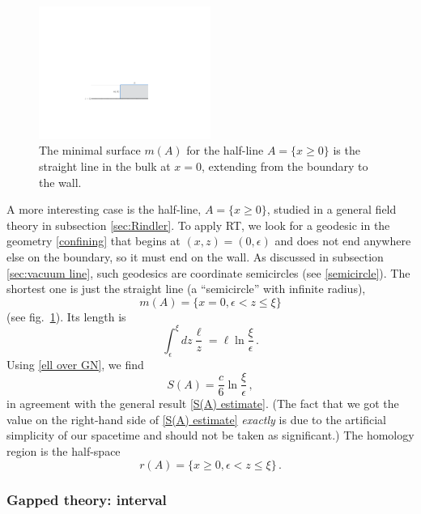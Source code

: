 \documentclass[11pt]{article}
\begin{document}
\begin{figure}[tbp]
\centering
\includegraphics[width=0.5\textwidth]{figs/gappedhalfline}
\caption{\label{fig:gappedhalfline}
The minimal surface $m(A)$ for the half-line $A=\{x\ge0\}$ is the straight line in the bulk at $x=0$, extending from the boundary to the wall.
}
\end{figure}

A more interesting case is the half-line, $A=\{x\ge0\}$, studied in a general field theory in subsection \ref{sec:Rindler}. To apply RT, we look for a geodesic in the geometry \eqref{confining} that begins at $(x,z)=(0,\epsilon)$  and does not end anywhere else on the boundary, so it must end on the wall. As discussed in subsection \ref{sec:vacuum line}, such geodesics are coordinate semicircles (see \eqref{semicircle}). The shortest one is just the straight line (a ``semicircle'' with infinite radius),
\begin{equation}
m(A) = \{x=0, \epsilon<z\le\xi\}
\end{equation}
(see fig.\ \ref{fig:gappedhalfline}). Its length is
\begin{equation}
\int_\epsilon^\xi dz\frac\ell z = \ell\ln\frac\xi\epsilon\,.
\end{equation}
Using \eqref{ell over GN}, we find
\begin{equation}
S(A) = \frac c6\ln\frac\xi\epsilon\,,
\end{equation}
in agreement with the general result \eqref{S(A) estimate}. (The fact that we got the value on the right-hand side of \eqref{S(A) estimate} \emph{exactly} is  due to the artificial simplicity of our spacetime and should not be taken as significant.) The homology region is the half-space
\begin{equation}
r(A) = \{x\ge0,\epsilon< z\le\xi\}\,.
\end{equation}



\subsubsection{Gapped theory: interval}
\label{sec:gapped interval}
\end{document}
